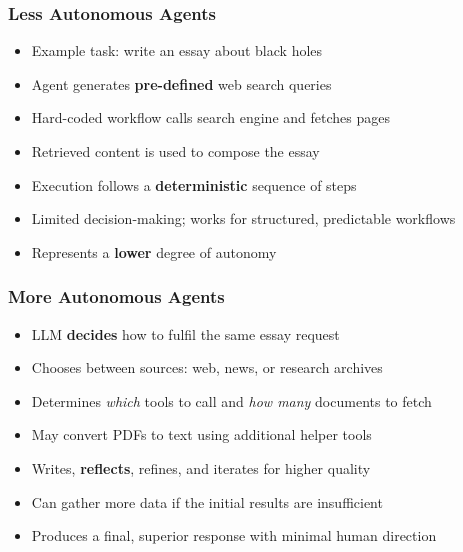 \begin{frame}[fragile]\frametitle{Less Autonomous Agents}
      \begin{itemize}
        \item Example task: write an essay about black holes
        \item Agent generates \textbf{pre-defined} web search queries
        \item Hard-coded workflow calls search engine and fetches pages
        \item Retrieved content is used to compose the essay
        \item Execution follows a \textbf{deterministic} sequence of steps
        \item Limited decision-making; works for structured, predictable workflows
        \item Represents a \textbf{lower} degree of autonomy
      \end{itemize}
\end{frame}

\begin{frame}[fragile]\frametitle{More Autonomous Agents}
      \begin{itemize}
        \item LLM \textbf{decides} how to fulfil the same essay request
        \item Chooses between sources: web, news, or research archives
        \item Determines \emph{which} tools to call and \emph{how many} documents to fetch
        \item May convert PDFs to text using additional helper tools
        \item Writes, \textbf{reflects}, refines, and iterates for higher quality
        \item Can gather more data if the initial results are insufficient
        \item Produces a final, superior response with minimal human direction
      \end{itemize}
\end{frame}


